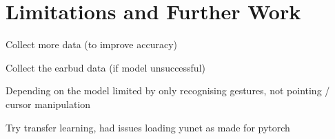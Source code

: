 \section{Limitations and Further Work} %
Collect more data (to improve accuracy)

Collect the earbud data (if model unsuccessful)



Depending on the model limited by only recognising gestures, not pointing / cursor manipulation

Try transfer learning, had issues loading yunet as made for pytorch

